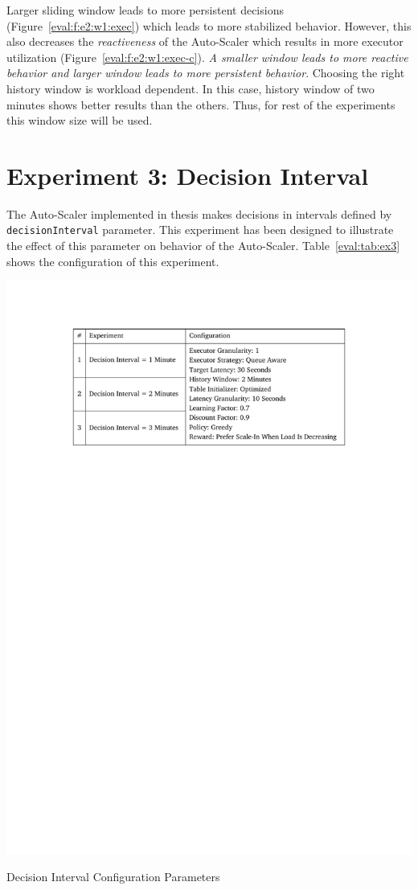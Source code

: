 Larger sliding window leads to more persistent decisions (Figure~\ref{eval:f:e2:w1:exec}) which leads to more stabilized behavior. However, this also decreases the \emph{reactiveness} of the Auto-Scaler which results in more executor utilization (Figure~\ref{eval:f:e2:w1:exec-c}). \emph{A smaller window leads to more reactive behavior and larger window leads to more persistent behavior}. Choosing the right history window is workload dependent. In this case, history window of two minutes shows better results than the others. Thus, for rest of the experiments this window size will be used.
\clearpage
\section{Experiment 3: Decision Interval}
The Auto-Scaler implemented in thesis makes decisions in intervals defined by \lstinline|decisionInterval| parameter. This experiment has been designed to illustrate the effect of this parameter on behavior of the Auto-Scaler. Table~\ref{eval:tab:ex3} shows the configuration of this experiment.
\begin{table}[h]
    \includegraphics[clip,trim=3.3cm 21.18cm 3.25cm 2.5cm]{tables/ex3.pdf}
    \centering
    \caption{Decision Interval Configuration Parameters}
    \label{eval:tab:ex3}
\end{table}

